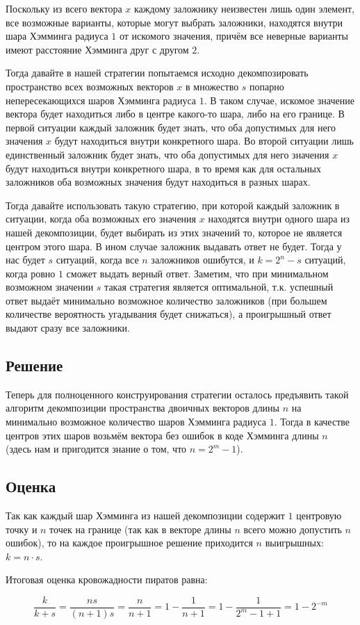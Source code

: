 \documentclass[fontsize=14pt]{article}
\begin{document}
Поскольку из всего вектора $x$ каждому заложнику неизвестен лишь один элемент, все возможные варианты, которые могут выбрать заложники, находятся внутри шара Хэмминга радиуса $1$ от искомого значения, причём все неверные варианты имеют расстояние Хэмминга друг с другом $2$.

Тогда давайте в нашей стратегии попытаемся исходно декомпозировать пространство всех возможных векторов $x$ в множество $s$ попарно непересекающихся шаров Хэмминга радиуса $1$. В таком случае, искомое значение вектора будет находиться либо в центре какого-то шара, либо на его границе. В первой ситуации каждый заложник будет знать, что оба допустимых для него значения $x$ будут находиться внутри конкретного шара. Во второй ситуации лишь единственный заложник будет знать, что оба допустимых для него значения $x$ будут находиться внутри конкретного шара, в то время как для остальных заложников оба возможных значения будут находиться в разных шарах.

Тогда давайте использовать такую стратегию, при которой каждый заложник в ситуации, когда оба возможных его значения $x$ находятся внутри одного шара из нашей декомпозиции, будет выбирать из этих значений то, которое не является центром этого шара. В ином случае заложник выдавать ответ не будет. Тогда у нас будет $s$ ситуаций, когда все $n$ заложников ошибутся, и $k = 2^n - s$ ситуаций, когда ровно $1$ сможет выдать верный ответ. Заметим, что при минимальном возможном значении $s$ такая стратегия является оптимальной, т.к. успешный ответ выдаёт минимально возможное количество заложников (при большем количестве вероятность угадывания будет снижаться), а проигрышный ответ выдают сразу все заложники.

\subsection*{Решение}

Теперь для полноценного конструирования стратегии осталось предъявить такой алгоритм декомпозиции пространства двоичных векторов длины $n$ на минимально возможное количество шаров Хэмминга радиуса $1$. Тогда в качестве центров этих шаров возьмём вектора без ошибок в коде Хэмминга длины $n$ (здесь нам и пригодится знание о том, что $n = 2^m - 1$).

\subsection*{Оценка}

Так как каждый шар Хэмминга из нашей декомпозиции содержит $1$ центровую точку и $n$ точек на границе (так как в векторе длины $n$ всего можно допустить $n$ ошибок), то на каждое проигрышное решение приходится $n$ выигрышных: $k = n \cdot s$.

Итоговая оценка кровожадности пиратов равна:

$$\frac{k}{k + s} = \frac{n s}{(n + 1) s} = \frac{n}{n + 1} = 1 - \frac{1}{n + 1} = 1 - \frac{1}{2^m - 1 + 1} = 1 - 2^{-m}$$
\end{document}
